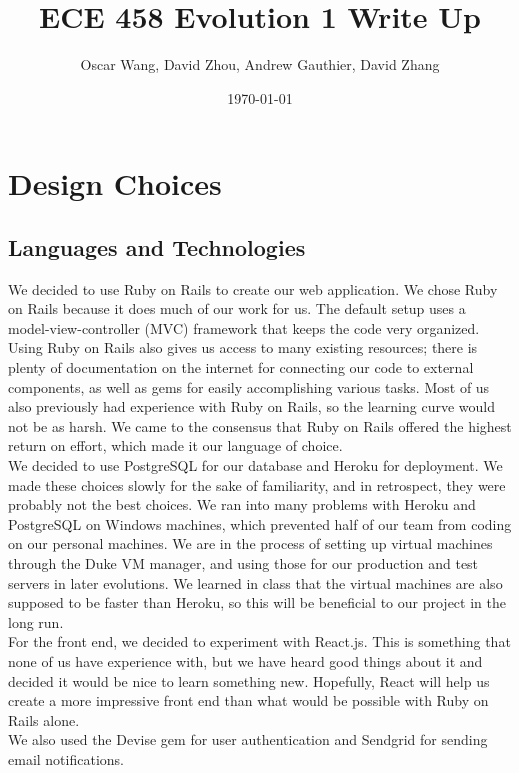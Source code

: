 \documentclass{article}
\author{Oscar Wang, David Zhou, Andrew Gauthier, David Zhang}
\date{\today}
\title{ECE 458 Evolution 1 Write Up}
\begin{document}
\maketitle
\section{Design Choices}
\subsection{Languages and Technologies}
We decided to use Ruby on Rails to create our web application.  We chose Ruby on Rails because it does much of our work for us. The default setup uses a model-view-controller (MVC) framework that keeps the code very organized.  Using Ruby on Rails also gives us access to many existing resources; there is plenty of documentation on the internet for connecting our code to external components, as well as gems for easily accomplishing various tasks.  Most of us also previously had experience with Ruby on Rails, so the learning curve would not be as harsh.  We came to the consensus that Ruby on Rails offered the highest return on effort, which made it our language of choice.\\
We decided to use PostgreSQL for our database and Heroku for deployment.  We made these choices slowly for the sake of familiarity, and in retrospect, they were probably not the best choices.  We ran into many problems with Heroku and PostgreSQL on Windows machines, which prevented half of our team from coding on our personal machines.  We are in the process of setting up virtual machines through the Duke VM manager, and using those for our production and test servers in later evolutions.  We learned in class that the virtual machines are also supposed to be faster than Heroku, so this will be beneficial to our project in the long run.\\
For the front end, we decided to experiment with React.js.  This is something that none of us have experience with, but we have heard good things about it and decided it would be nice to learn something new.  Hopefully, React will help us create a more impressive front end than what would be possible with Ruby on Rails alone.\\
We also used the Devise gem for user authentication and Sendgrid for sending email notifications.
\end{document}

